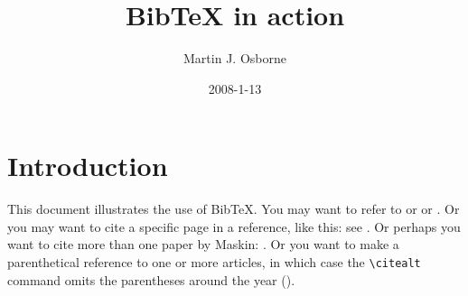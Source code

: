 \documentclass[12pt]{article}
\begin{document}
\title{BibTeX in action}
\author{Martin J. Osborne}
\date{2008-1-13}

\maketitle

\section{Introduction}
This document illustrates the use of BibTeX\@.  You may want to refer to
\cite{ahu61} or \cite{ab94} or \cite{m85}.  Or you may want to cite a
specific page in a reference, like this: see \citet[p.~199]{m85}.  Or
perhaps you want to cite more than one paper by Maskin: \cite{m85, m99}.
Or you want to make a parenthetical reference to one or more articles, in which case the \verb+\citealt+ command omits the parentheses around the year (\citealt{ahu61}).




\end{document}
